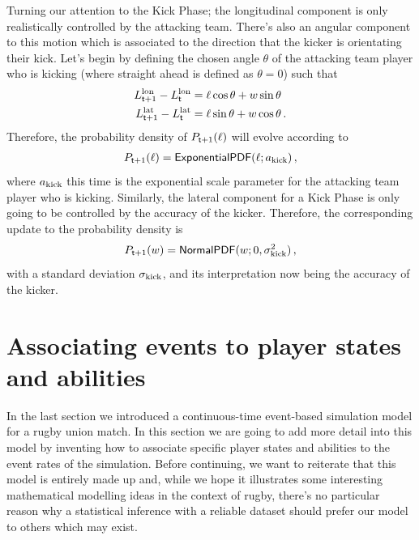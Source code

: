 Turning our attention to the {\sf Kick Phase}; the longitudinal component is only realistically controlled by the attacking team. There's also an angular component to this motion which is associated to the direction that the kicker is orientating their kick. Let's begin by defining the chosen angle $\theta$ of the attacking team player who is kicking (where straight ahead is defined as $\theta = 0$) such that
\begin{align}
L^{\rm lon}_{{\sf t}+1}-L^{\rm lon}_{{\sf t}}&=\ell \cos \theta + w \sin \theta \\
L^{\rm lat}_{{\sf t}+1}-L^{\rm lat}_{{\sf t}}&=\ell \sin \theta + w \cos \theta \,.
\end{align} 
Therefore, the probability density of $P_{{\sf t}+1}(\ell )$ will evolve according to
\begin{align}
P_{{\sf t}+1}(\ell ) = {\sf ExponentialPDF}(\ell; a_{\rm kick}) \label{eq:longitudinal-motion-rugby-kicking} \,,
\end{align}
where $a_{\rm kick}$ this time is the exponential scale parameter for the attacking team player who is kicking. Similarly, the lateral component for a {\sf Kick Phase} is only going to be controlled by the accuracy of the kicker. Therefore, the corresponding update to the probability density is
\begin{align}
P_{{\sf t}+1}(w) = {\sf NormalPDF}(w;0, \sigma_{\rm kick}^2) \label{eq:lateral-motion-rugby-kicking} \,,
\end{align}
with a standard deviation $\sigma_{\rm kick}$, and its interpretation now being the accuracy of the kicker.

\section{\sffamily Associating events to player states and abilities}

In the last section we introduced a continuous-time event-based simulation model for a rugby union match. In this section we are going to add more detail into this model by inventing how to associate specific player states and abilities to the event rates of the simulation. Before continuing, we want to reiterate that this model is entirely made up and, while we hope it illustrates some interesting mathematical modelling ideas in the context of rugby, there's no particular reason why a statistical inference with a reliable dataset should prefer our model to others which may exist.

